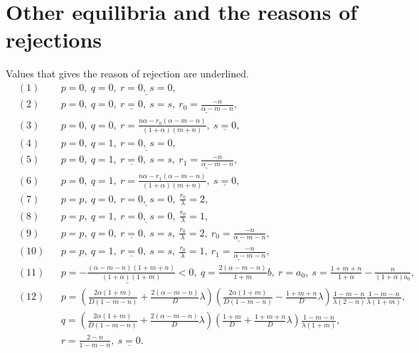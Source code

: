 \documentclass[a4paper,11pt]{article}
\theoremstyle{remark}
\begin{document}
\section{Other equilibria and the reasons of rejections}\label{append:equi_reject}
Values that gives the reason of rejection are underlined.
\begin{align*}
 &(1) & & p=0, \ q=0, \ \underline{ r=0, \ s=0},\\
 &(2) & & p=0, \ q=0, \ \underline{ r=0},\ s=s, \ \underline{ r_0 = \frac{-n}{\alpha-m-n}},\\
 &(3) & & p=0, \ q=0, \ r = \frac{n\alpha - r_0(\alpha-m-n)}{(1+\alpha)(m+n)},\ \underline{ s=0},\\
 &(4) & & p=0, \ q=1, \ \underline{ r=0, \ s=0}, \\
 &(5) & & p=0, \ q=1, \ \underline{ r=0},\ s=s, \ \underline{ r_1 = \frac{-n}{\alpha-m-n}},\\
 &(6) & & p=0, \ q=1, \ r = \frac{n\alpha - r_1(\alpha-m-n)}{(1+\alpha)(m+n)},\ \underline{ s=0},\\
 &(7) & & p=p, \ q=0, \ \underline{ r=0, \ s=0}, \ \frac{r_0}{\lambda}=2, \\
 &(8) & & p=p, \ q=1, \ \underline{ r=0, \ s=0}, \ \frac{r_0}{\lambda}=1, \\
 &(9) & & p=p, \ q=0, \ \underline{ r=0}, \ s=s, \ \frac{r_0}{\lambda}=2, \ \underline{ r_0 = \frac{-n}{\alpha-m-n}}, \\
 &(10) & & p=p, \ q=1, \ \underline{ r=0}, \ s=s, \ \frac{r_0}{\lambda}=1, \ \underline{ r_1 = \frac{-n}{\alpha-m-n}}, \\
 &(11) & & \underline{ p=-\frac{(\alpha-m-n)(1+m+n)}{(1+\alpha)(1+m)}<0}, \ q=\frac{2(\alpha-m-n)}{1+m}b, \ r=a_0, \ s=\frac{1+m+n}{1+\alpha} - \frac{n}{(1+\alpha)a_0},\\
 &(12) & & p=\left( \frac{2\alpha(1+m)}{D(1-m-n)} + \frac{2(\alpha-m-n)}{D}\lambda\right)\left(\frac{2\alpha(1+m)}{D(1-m-n)} - \frac{1+m+n}{D}\lambda\right)\frac{1-m-n}{\lambda(2-n)}\frac{1-m-n}{\lambda(1+m)}, \\
 & & &q=\left( \frac{2\alpha(1+m)}{D(1-m-n)} + \frac{2(\alpha-m-n)}{D}\lambda\right)\left(\frac{1+m}{D} + \frac{1+m+n}{D}\lambda\right)\frac{1-m-n}{\lambda(1+m)},\\
 & & &r = \frac{2-n}{1-m-n}, \ \underline{ s=0}.
\end{align*}
\end{document}
